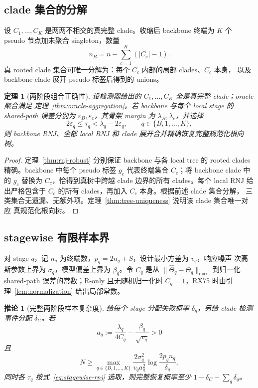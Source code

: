 \documentclass[UTF8,11pt]{ctexart}
\newtheorem{theorem}[definition]{定理}
\newtheorem{corollary}[definition]{推论}
\begin{document}
\subsection{clade 集合的分解}

设 $C_1,\ldots,C_K$ 是两两不相交的真完整 clade。收缩后 backbone 终端为
$K$ 个 pseudo 节点加未聚合 singleton，数量
\begin{equation}
 n_B=n-\sum_{c=1}^K(|C_c|-1).
 \label{eq:backbone-size}
\end{equation}
真 rooted clade 集合可唯一分解为：每个 $C_c$ 内部的局部 clades、$C_c$ 本身，
以及 backbone clade 展开 pseudo 标签后得到的 unions。

\begin{theorem}[两阶段组合正确性]
\label{thm:two-stage-correct}
设检测器给出的 $C_1,\ldots,C_K$ 全是真完整 clade；oracle 聚合满足
定理~\ref{thm:oracle-aggregation}。若 backbone 与每个 local stage 的
shared-path 误差分别为 $\varepsilon_B,\varepsilon_c$，其骨架 margin 为
$\lambda_B,\lambda_c$，并选择
\begin{equation}
 2\varepsilon_q\le\tau_q<\lambda_q-2\varepsilon_q,
 \qquad q\in\{B,1,\ldots,K\},
 \label{eq:stagewise-rnj}
\end{equation}
则 backbone RNJ、全部 local RNJ 和 clade 展开合并精确恢复完整规范化根向树。
\end{theorem}

\begin{proof}
定理~\ref{thm:rnj-robust} 分别保证 backbone 与各 local tree 的 rooted clades
精确。backbone 中每个 pseudo 标签 $g_c$ 代表终端集合 $C_c$；将 backbone clade 中的
$g_c$ 替换为 $C_c$，恰得到真树中跨越 clade 边界的所有 clades。每个 local RNJ
给出严格包含于 $C_c$ 的所有 clades，再加入 $C_c$ 本身。根据前述 clade 集合分解，
三类集合无遗漏、无额外项。定理~\ref{thm:tree-uniqueness} 说明该 clade 集合唯一对应
真规范化根向树。
\end{proof}

\subsection{stagewise 有限样本界}

对 stage $q$，记 $n_q$ 为终端数，$p_q=2n_q+S$，设计最小方差为 $v_q$，响应噪声
次高斯参数上界为 $\sigma_q$，模型偏差上界为 $\beta_q$。令 $C_q$ 是从
$\|\widehat\Theta_q-\Theta_q\|_{\max}$ 到归一化 shared-path 误差的常数；R-only
且无随机归一化时 $C_q=1$，RX75 时由引理~\ref{lem:normalization} 给出局部常数。

\begin{corollary}[完整两阶段样本复杂度]
\label{cor:two-stage-sample}
给每个 stage 分配失败概率 $\delta_q$，另给 clade 检测事件分配 $\delta_C$。若
\begin{equation}
 a_q:=\frac{\lambda_q}{4C_q}-\frac{\beta_q}{\sqrt{v_q}}>0
 \label{eq:positive-gap}
\end{equation}
且
\begin{equation}
 N\ge
 \max_{q\in\{B,1,\ldots,K\}}
 \frac{2\sigma_q^2}{v_q a_q^2}
 \log\frac{2p_qn_q}{\delta_q},
 \label{eq:correct-sample-complexity}
\end{equation}
同时各 $\tau_q$ 按式~\eqref{eq:stagewise-rnj} 选取，则完整恢复概率至少
$1-\delta_C-\sum_q\delta_q$。
\end{corollary}
\end{document}
